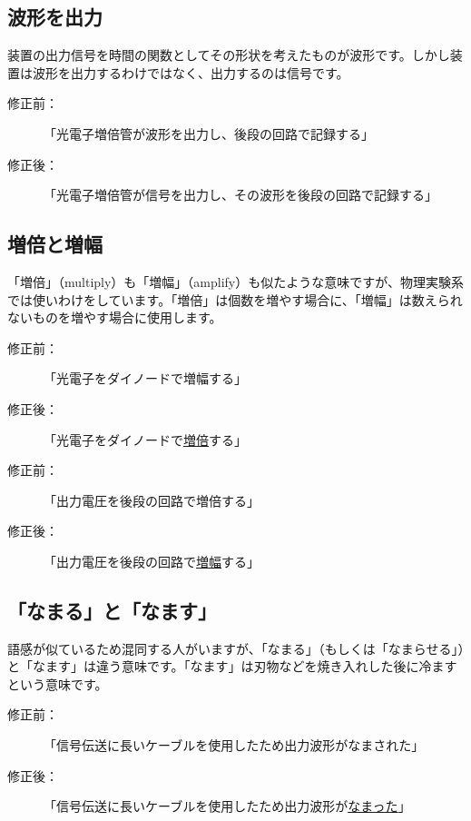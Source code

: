 \subsection{波形を出力}

装置の出力信号を時間の関数としてその形状を考えたものが波形です。しかし装置は波形を出力するわけではなく、出力するのは信号です。

\begin{description}
\item[修正前：]「光電子増倍管が波形を出力し、後段の回路で記録する」
\item[修正後：]「光電子増倍管が信号を出力し、その波形を後段の回路で記録する」
\end{description}

\subsection{増倍と増幅}

「増倍」（multiply）も「増幅」（amplify）も似たような意味ですが、物理実験系では使いわけをしています。「増倍」は個数を増やす場合に、「増幅」は数えられないものを増やす場合に使用します。

\begin{description}
\item[修正前：]「光電子をダイノードで増幅する」
\item[修正後：]「光電子をダイノードで\underline{増倍}する」
\end{description}

\begin{description}
\item[修正前：]「出力電圧を後段の回路で増倍する」
\item[修正後：]「出力電圧を後段の回路で\underline{増幅}する」
\end{description}

\subsection{「なまる」と「なます」}

語感が似ているため混同する人がいますが、「なまる」（もしくは「なまらせる」）と「なます」は違う意味です。「なます」は刃物などを焼き入れした後に冷ますという意味です。

\begin{description}
\item[修正前：]「信号伝送に長いケーブルを使用したため出力波形がなまされた」
\item[修正後：]「信号伝送に長いケーブルを使用したため出力波形が\underline{なまった}」
\end{description}

